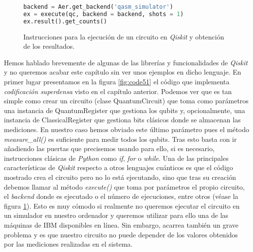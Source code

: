 \begin{figure}[htb!]
\begin{lstlisting}[language=Python]
backend = Aer.get_backend('qasm_simulator')
ex = execute(qc, backend = backend, shots = 1)
ex.result().get_counts()
\end{lstlisting}
\caption{Instrucciones para la ejecución de un circuito en \textit{Qiskit} y obtención de los resultados.}
\label{fig:code52}
\end{figure}

Hemos hablado brevemente de algunas de las librerías y funcionalidades de \textit{Qiskit} y no queremos acabar este capítulo sin ver unos ejemplos en dicho lenguaje. En primer lugar presentamos en la figura \ref{fig:code51} el código que implementa \textit{codificación superdensa} visto en el capítulo anterior. Podemos ver que es tan simple como crear un circuito (clase QuantumCircuit) que toma como parámetros una instancia de QuantumRegister que gestiona los qubits y, opcionalmente, una instancia de ClassicalRegister que gestiona bits clásicos donde se almacenan las mediciones. En nuestro caso hemos obviado este último parámetro pues el método \textit{measure\_all()} es suficiente para medir todos los qubits. Tras esto basta con ir añadiendo las puertas que precisemos usando para ello, si es necesario, instrucciones clásicas de \textit{Python} como \textit{if}, \textit{for} o \textit{while}. Una de las principales características de \textit{Qiskit} respecto a otros lenguajes cuánticos es que el código mostrado crea el circuito pero no lo está ejecutando, sino que tras su creación debemos llamar al método \textit{execute()} que toma por parámetros el propio circuito, el \textit{backend} donde es ejecutado o el número de ejecuciones, entre otros (véase la figura \ref{fig:code52}). Esto es muy cómodo si realmente no queremos ejecutar el circuito en un simulador en nuestro ordenador y queremos utilizar para ello una de las máquinas de IBM disponibles en línea. Sin embargo, acarrea también un grave problema y es que nuestro circuito no puede depender de los valores obtenidos por las mediciones realizadas en el sistema.


